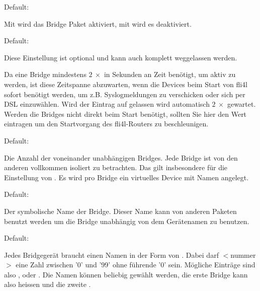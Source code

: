 \begin{description}


  Default: 

  Mit  wird das Bridge Paket aktiviert, mit  wird
  es deaktiviert.


  Default: 

  Diese Einstellung ist optional und kann auch komplett weggelassen
  werden.

  Da eine Bridge mindestens $2\ \times$  in
  Sekunden an Zeit benötigt, um aktiv zu werden, ist diese Zeitspanne
  abzuwarten, wenn die Devices beim Start von fli4l sofort benötigt
  werden, um z.B. Syslogmeldungen zu verschicken oder sich per DSL
  einzuwählen. Wird der Eintrag auf  gelassen wird automatisch
  $2\ \times$  gewartet. Werden die Bridges
  nicht direkt beim Start benötigt, sollten Sie hier den Wert
   eintragen um den Startvorgang des fli4l-Routers zu
  beschleunigen.



  Default: 

  Die Anzahl der voneinander unabhängigen Bridges. Jede Bridge ist von
  den anderen vollkommen isoliert zu betrachten. Das gilt insbesondere
  für die Einstellung von .  Es wird pro
  Bridge ein virtuelles Device mit Namen  angelegt.


  Default: 

  Der symbolische Name der Bridge. Dieser Name kann von anderen
  Paketen benutzt werden um die Bridge unabhängig von dem Gerätenamen
  zu benutzen.


  Default: 

  Jedes Bridgegerät braucht einen Namen in der Form von
  . Dabei darf $<$nummer$>$ eine Zahl zwischen '0' und
  '99' ohne führende '0' sein. Mögliche Einträge sind also
  ,  oder . Die Namen können
  beliebig gewählt werden, die erste Bridge kann also 
  heissen und die zweite .


\end{description}
